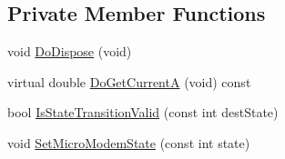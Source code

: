 \subsection*{Private Member Functions}
\begin{DoxyCompactItemize}
\item 
void \hyperlink{classns3_1_1AcousticModemEnergyModel_a37a4c65a4c1d9b8bd24ae620ed86308f}{Do\+Dispose} (void)
\item 
virtual double \hyperlink{classns3_1_1AcousticModemEnergyModel_a8f7fd5171674f8b48e4a7c7806741129}{Do\+Get\+CurrentA} (void) const 
\item 
bool \hyperlink{classns3_1_1AcousticModemEnergyModel_ae9feec10f18afb384f0ce85e6a7f2ea2}{Is\+State\+Transition\+Valid} (const int dest\+State)
\item 
void \hyperlink{classns3_1_1AcousticModemEnergyModel_a48ddf2c511e50d693a8a9bc4e3dc8d55}{Set\+Micro\+Modem\+State} (const int state)
\end{DoxyCompactItemize}
